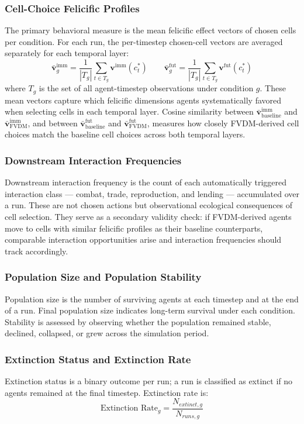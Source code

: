 \documentclass{icsthesis}
\begin{document}
\begin{mainmatter}
\subsubsection{Cell-Choice Felicific Profiles}
The primary behavioral measure is the mean felicific effect vectors of chosen cells per condition. For each run, the per-timestep chosen-cell vectors are averaged separately for each temporal layer:
\[
\bar{\mathbf{v}}^{\mathrm{imm}}_g = \frac{1}{|T_g|} \sum_{t \in T_g} \mathbf{v}^{\mathrm{imm}}(c_t^*)
\qquad
\bar{\mathbf{v}}^{\mathrm{fut}}_g = \frac{1}{|T_g|} \sum_{t \in T_g} \mathbf{v}^{\mathrm{fut}}(c_t^*)
\]
where $T_g$ is the set of all agent-timestep observations under condition $g$. These mean vectors capture which felicific dimensions agents systematically favored when selecting cells in each temporal layer. Cosine similarity between $\bar{\mathbf{v}}^{\mathrm{imm}}_{\text{baseline}}$ and $\bar{\mathbf{v}}^{\mathrm{imm}}_{\text{FVDM}}$, and between $\bar{\mathbf{v}}^{\mathrm{fut}}_{\text{baseline}}$ and $\bar{\mathbf{v}}^{\mathrm{fut}}_{\text{FVDM}}$, measures how closely FVDM-derived cell choices match the baseline cell choices across both temporal layers.

\subsubsection{Downstream Interaction Frequencies}
Downstream interaction frequency is the count of each automatically triggered interaction class — combat, trade, reproduction, and lending — accumulated over a run. These are not chosen actions but observational ecological consequences of cell selection. They serve as a secondary validity check: if FVDM-derived agents move to cells with similar felicific profiles as their baseline counterparts, comparable interaction opportunities arise and interaction frequencies should track accordingly.

\subsubsection{Population Size and Population Stability}
Population size is the number of surviving agents at each timestep and at the end of a run. Final population size indicates long-term survival under each condition. Stability is assessed by observing whether the population remained stable, declined, collapsed, or grew across the simulation period.

\subsubsection{Extinction Status and Extinction Rate}
Extinction status is a binary outcome per run; a run is classified as extinct if no agents remained at the final timestep. Extinction rate is:
\[
\text{Extinction Rate}_g = \frac{N_{extinct,g}}{N_{runs,g}}
\]


\end{mainmatter}
\end{document}
